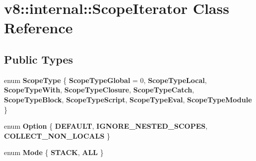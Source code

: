 \hypertarget{classv8_1_1internal_1_1ScopeIterator}{}\section{v8\+:\+:internal\+:\+:Scope\+Iterator Class Reference}
\label{classv8_1_1internal_1_1ScopeIterator}
\subsection*{Public Types}
\begin{DoxyCompactItemize}
\item 
\mbox{\label{classv8_1_1internal_1_1ScopeIterator_aa4aa3e4d41cb6ce47ec9df9a056fc49b}} 
enum {\bfseries Scope\+Type} \{ \newline
{\bfseries Scope\+Type\+Global} = 0, 
{\bfseries Scope\+Type\+Local}, 
{\bfseries Scope\+Type\+With}, 
{\bfseries Scope\+Type\+Closure}, 
\newline
{\bfseries Scope\+Type\+Catch}, 
{\bfseries Scope\+Type\+Block}, 
{\bfseries Scope\+Type\+Script}, 
{\bfseries Scope\+Type\+Eval}, 
\newline
{\bfseries Scope\+Type\+Module}
 \}
\item 
\mbox{\label{classv8_1_1internal_1_1ScopeIterator_a9127368b90641c8dea51ce83b2edf38d}} 
enum {\bfseries Option} \{ {\bfseries D\+E\+F\+A\+U\+LT}, 
{\bfseries I\+G\+N\+O\+R\+E\+\_\+\+N\+E\+S\+T\+E\+D\+\_\+\+S\+C\+O\+P\+ES}, 
{\bfseries C\+O\+L\+L\+E\+C\+T\+\_\+\+N\+O\+N\+\_\+\+L\+O\+C\+A\+LS}
 \}
\item 
\mbox{\label{classv8_1_1internal_1_1ScopeIterator_a7bb5a41d9fc691a5e09db08f7592d19b}} 
enum {\bfseries Mode} \{ {\bfseries S\+T\+A\+CK}, 
{\bfseries A\+LL}
 \}
\end{DoxyCompactItemize}
